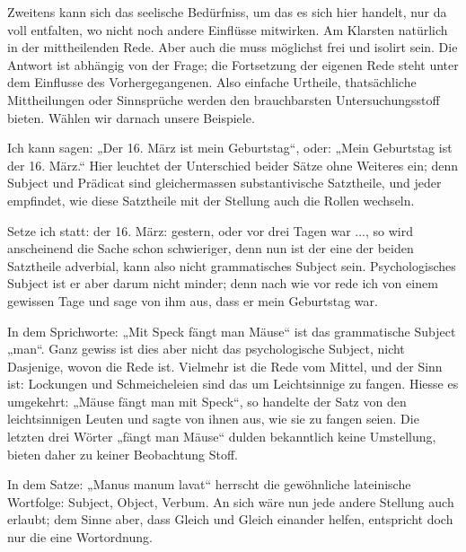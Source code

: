 Zweitens kann sich das seelische Bedürfniss, um das es sich hier handelt, nur da voll entfalten, wo nicht noch andere Einflüsse mitwirken. Am Klarsten natürlich in der mittheilenden Rede. Aber auch die muss möglichst frei und isolirt sein. Die Antwort ist abhängig von der Frage; die Fortsetzung der eigenen Rede steht unter dem Einflusse des Vorhergegangenen. Also einfache Urtheile, thatsächliche Mittheilungen oder Sinnsprüche werden den brauchbarsten Untersuchungsstoff bieten. Wählen wir darnach unsere Beispiele.

Ich kann sagen: „Der 16. März ist mein Geburtstag“, oder: „Mein Geburtstag ist der 16. März.“ Hier leuchtet der Unterschied beider Sätze ohne Weiteres ein; denn Subject und Prädicat sind gleichermassen substantivische Satztheile, und jeder empfindet, wie diese Satztheile mit der Stellung auch die Rollen wechseln.

Setze ich statt: der 16. März: gestern, oder vor drei Tagen war ..., so wird anscheinend die Sache schon schwieriger, denn nun ist der eine der beiden Satztheile adverbial, kann also nicht grammatisches Subject sein. Psychologisches Subject ist er aber darum nicht minder; denn nach wie vor rede ich von einem gewissen Tage und sage von ihm aus, dass er mein Geburtstag war.

\largerpage[1]In dem Sprichworte: „Mit Speck fängt man Mäuse“ ist das grammatische Subject „man“. Ganz gewiss ist dies aber nicht das psycho\label{fp.355}logische Subject, nicht Dasjenige, wovon die Rede ist. Vielmehr ist die Rede vom Mittel, und der Sinn ist: Lockungen und Schmeicheleien sind das  um Leichtsinnige zu fangen. Hiesse es umgekehrt: „Mäuse fängt man mit Speck“, so handelte der Satz von den leichtsinnigen Leuten und sagte von ihnen aus, wie sie zu fangen seien. Die letzten drei Wörter „fängt man Mäuse“ dulden bekanntlich keine Umstellung, bieten daher zu keiner Beobachtung Stoff.

In dem Satze: „Manus manum lavat“ herrscht die gewöhnliche lateinische \label{sp.371} Wortfolge: Subject, Object, Verbum. An sich wäre nun jede andere Stellung auch erlaubt; dem Sinne aber, dass Gleich und Gleich einander helfen, entspricht doch nur die eine Wortordnung.



